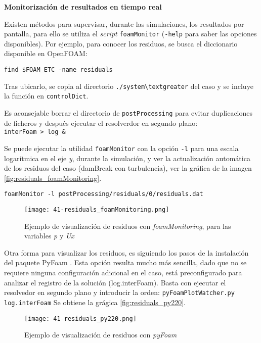 \textbf{Monitorización de resultados en tiempo
real}

Existen métodos para supervisar, durante las simulaciones, los
resultados por pantalla, para ello se utiliza el \emph{script}
\texttt{foamMonitor} (\texttt{-help} para saber las opciones
disponibles). Por ejemplo, para conocer los residuos, se busca el
diccionario disponible en OpenFOAM:

\begin{lstlisting}[style=bash]
  find $FOAM_ETC -name residuals
\end{lstlisting}

Tras ubicarlo, se copia al directorio \lstinline[style=bash]{./system\textgreater}
del caso y se incluye la función en \texttt{controlDict}.

Es aconsejable borrar el directorio de \texttt{postProcessing} para
evitar duplicaciones de ficheros y después ejecutar el resolverdor en
segundo plano: \texttt{interFoam\ \textgreater{}\ log\ \&}

Se puede ejecutar la utilidad \texttt{foamMonitor} con la opción
\texttt{-l} para una escala logarítmica en el eje \emph{y}, durante la
simulación, y ver la actualización automática de los residuos del caso (damBreak con turbulencia), ver la gráfica de la imagen \autoref{fig:residuals_foamMonitoring}. 

\begin{lstlisting}[style=bash]
  foamMonitor -l postProcessing/residuals/0/residuals.dat
\end{lstlisting}

\begin{figure}[ht]
\centering
\texttt{[image: 41-residuals\_foamMonitoring.png]}
\caption[Ejemplo de visualización de residuos con \emph{foamMonitoring}]{Ejemplo de visualización de residuos con \emph{foamMonitoring}, para las variables \emph{p} y \emph{Ux}}
\label{fig:residuals_foamMonitoring}
\end{figure}

Otra forma para visualizar los residuos, es siguiendo los pasos de la
instalación del paquete
PyFoam \cite{pyfoam}. Esta
opción resulta mucho más sencilla, dado que no se requiere ninguna
configuración adicional en el caso, está preconfigurado para analizar
el registro de la solución (log.interFoam). Basta con ejecutar el
resolvedor en segundo plano y introducir la orden:
\lstinline[style=bash]{pyFoamPlotWatcher.py log.interFoam} 
Se obtiene la grágica \autoref{fig:residuals_py220}.

\begin{figure}[ht]
\centering
\texttt{[image: 41-residuals\_py220.png]}
\caption{Ejemplo de visualización de residuos con \emph{pyFoam}}
\label{fig:residuals_py220}
\end{figure}
